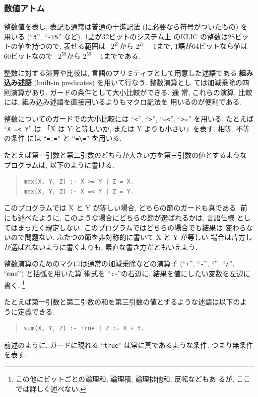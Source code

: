 \documentclass[a4,titlepage]{jsreport}
\def\em{\bf\dg}
\let\dg\bf
\newenvironment{program}{\begin{quote}}{\end{quote}}
\begin{document}
\subsubsection{数値アトム}
整数値を表し, 表記も通常は普通の十進記法 (に必要なら符号がついたもの) 
を用いる (``{\tt 3}'', ``{\tt -15}'' など).  1語が32ビットのシステム上
のKLIC の整数は28ビットの値を持つので, 表せる範囲は\(-2^{27}\)から
\(2^{27}-1\)まで, 1語が64ビットなら値は60ビットなので\(-2^{59}\)から
\(2^{59}-1\)までである.

整数に対する演算や比較は, 言語のプリミティブとして用意した述語である
{\em 組み込み述語} (built-in predicates) を用いて行なう.  整数演算とし
ては加減乗除の四則演算があり, ガードの条件として大小比較ができる.  通
常, これらの演算, 比較には, 組み込み述語を直接用いるよりもマクロ記法を
用いるのが便利である.

整数についてのガードでの大小比較には ``\verb|<|'', ``\verb|>|'',
``\verb|=<|'', ``\verb|>=|'' を用いる.  たとえば ``{\tt X =< Y}'' は
「X は Y と等しいか, または Y よりも小さい」を表す.  相等, 不等の条件
には ``\verb|=:=|'' と ``\verb|=\=|'' を用いる.

たとえば第一引数と第二引数のどちらか大きい方を第三引数の値とするような
プログラムは, 以下のように書ける.

\begin{program}
\begin{Verbatim}[baselinestretch=0.8]
max(X, Y, Z) :- X >= Y | Z = X.
max(X, Y, Z) :- X =< Y | Z = Y.
\end{Verbatim}
\end{program}

このプログラムでは X と Y が等しい場合, どちらの節のガードも真である. 
前にも述べたように, このような場合にどちらの節が選ばれるかは, 言語仕様
としてはまったく規定しない.  このプログラムではどちらの場合でも結果は
変わらないので問題ない.  ふたつの節を非対称的に書いて X と Y が等しい
場合は片方しか選ばれないように書くよりも, 素直な書き方だともいえよう.

整数演算のためのマクロは通常の加減乗除などの演算子 (``{\tt +}'',
``{\tt -}'', ``{\tt *}'', ``{\tt /}'', ``{\tt mod}'') と括弧を用いた算
術式を ``{\tt :=}''の右辺に, 結果を値にしたい変数を左辺に書く.
\footnote{この他にビットごとの論理和, 論理積, 論理排他和, 反転などもあ
るが, ここでは詳しく述べない.}

たとえば第一引数と第二引数の和を第三引数の値とするような述語は以下のよ
うに定義できる.
\begin{program}
\begin{verbatim}
sum(X, Y, Z) :- true | Z := X + Y.
\end{verbatim}
\end{program}
前述のように, ガードに現れる ``{\tt true}'' は常に真であるような条件, 
つまり無条件を表す.
\end{document}
